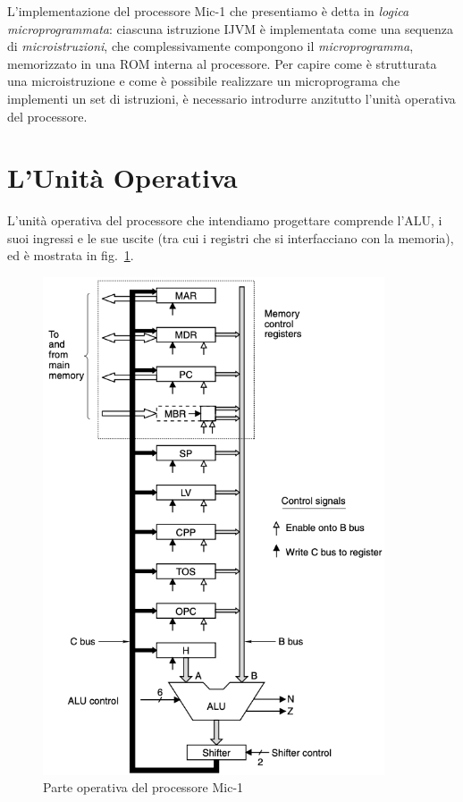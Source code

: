 \documentclass[a4paper,12pt]{scrreprt}
\begin{document}
L'implementazione del processore Mic-1 che presentiamo è detta in \textit{logica
  microprogrammata}: ciascuna istruzione IJVM è implementata come una sequenza
di \textit{microistruzioni}, che complessivamente compongono il
\textit{microprogramma}, memorizzato in una ROM interna al processore. Per
capire come è strutturata una microistruzione e come è possibile realizzare un
microprograma che implementi un set di istruzioni, è necessario introdurre
anzitutto l'unità operativa del processore.

\section{L'Unità Operativa}
L'unità operativa del processore che intendiamo progettare comprende l'ALU, i
suoi ingressi e le sue uscite (tra cui i registri che si interfacciano con la
memoria), ed è mostrata in fig.~\ref{fig:datapath}.

\begin{figure}
  \centering
  \includegraphics[width=0.9\textwidth]{datapath.png}
  \caption{Parte operativa del processore Mic-1}\label{fig:datapath}
\end{figure}
\end{document}
